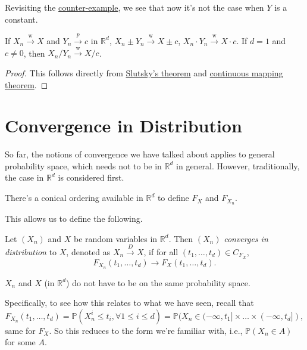 Revisiting the \hyperref[eg:counter-example-continuous-mapping]{counter-example}, we see that now it's not the case when \(Y\) is a constant.

\begin{corollary}\label{col:Slutsky}
	If \(X_n \overset{\text{w} }{\to } X \) and \(Y_n \overset{p}{\to } c\) in \(\mathbb{R} ^d\), \(X_n \pm Y_n \overset{\text{w} }{\to } X \pm c\), \(X_n \cdot Y_n \overset{\text{w} }{\to } X \cdot c\). If \(d = 1\) and \(c \neq 0\), then \(X_n / Y_n \overset{\text{w} }{\to } X / c\).
\end{corollary}
\begin{proof}
	This follows directly from \hyperref[thm:Slutsky]{Slutsky's theorem} and \hyperref[thm:continuous-mapping]{continuous mapping theorem}.
\end{proof}

\section{Convergence in Distribution}
So far, the notions of convergence we have talked about applies to general probability space, which needs not to be in \(\mathbb{R} ^d\) in general. However, traditionally, the case in \(\mathbb{R} ^d\) is considered first.

\begin{intuition}
	There's a conical ordering available in \(\mathbb{R} ^d\) to define \(F_X\) and \(F_{X_n}\).
\end{intuition}

This allows us to define the following.

\begin{definition}\label{def:converge-in-distribution}
	Let \((X_n)\) and \(X\) be random variables in \(\mathbb{R} ^d\). Then \((X_n)\) \emph{converges in distribution} to \(X\), denoted as \(X_n \overset{D}{\to } X\), if for all \((t_1, \dots , t_d) \in C_{F_X}\),
	\[
		F_{X_n} (t_1, \dots , t_d) \to F_X (t_1, \dots , t_d).
	\]
\end{definition}

\begin{note}
	\(X_n\) and \(X\) (in \(\mathbb{R} ^d\)) do not have to be on the same probability space.
\end{note}

Specifically, to see how this relates to what we have seen, recall that
\[
	F_{X_n}(t_1, \dots , t_d)
	= \mathbb{P} (X_n^i \leq t_i , \forall1 \leq i \leq d)
	= \mathbb{P} (X_n \in (-\infty , t_1] \times \dots \times (-\infty , t_d]),
\]
same for \(F_X\). So this reduces to the form we're familiar with, i.e., \(\mathbb{P} (X_n \in A)\) for some \(A\).

